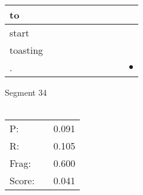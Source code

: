 \documentclass[landscape]{article}
\newcommand{\ssp}{\hspace{2pt}}
\newcommand{\mex}{\cellcolor{g}$\bullet$}
\begin{document}
\begin{tabular}{|l|p{10pt}|p{10pt}|p{10pt}|p{10pt}|p{10pt}|p{10pt}|p{10pt}|p{10pt}|p{10pt}|}
\hline
\ssp to \ssp&\hspace{2pt}&\hspace{2pt}&\hspace{2pt}&\hspace{2pt}&\hspace{2pt}&\hspace{2pt}&\hspace{2pt}&\hspace{2pt}&\hspace{2pt}\\
\hline
\ssp start \ssp&\hspace{2pt}&\hspace{2pt}&\hspace{2pt}&\hspace{2pt}&\hspace{2pt}&\hspace{2pt}&\hspace{2pt}&\hspace{2pt}&\hspace{2pt}\\
\hline
\ssp toasting \ssp&\hspace{2pt}&\hspace{2pt}&\hspace{2pt}&\hspace{2pt}&\hspace{2pt}&\hspace{2pt}&\hspace{2pt}&\hspace{2pt}&\hspace{2pt}\\
\hline
\ssp \cellcolor{ref8}. \ssp&\hspace{2pt}&\hspace{2pt}&\hspace{2pt}&\hspace{2pt}&\hspace{2pt}&\hspace{2pt}&\hspace{2pt}&\hspace{2pt}&\hspace{2pt}\mex\\
\hline
\end{tabular}

\vspace{6pt}
\noindent Segment 34\\\\
\noindent\begin{tabular}{lm{12pt}r}
\hline
P:&&0.091\\
R:&&0.105\\
Frag:&&0.600\\
Score:&&0.041\\
\end{tabular}
\end{document}
